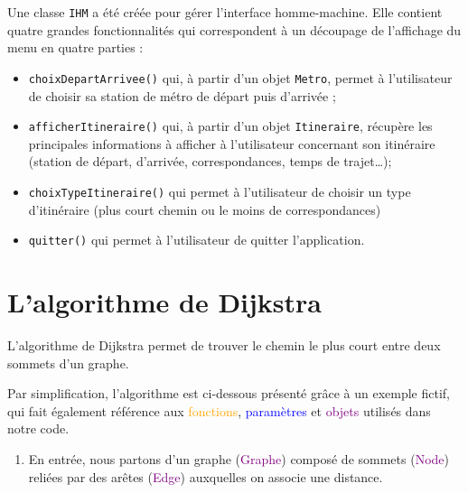 \documentclass[,french]{article}
\providecommand{\tightlist}{%
  \setlength{\itemsep}{0pt}\setlength{\parskip}{0pt}}
\begin{document}
Une classe \texttt{IHM} a été créée pour gérer l'interface
homme-machine. Elle contient quatre grandes fonctionnalités qui
correspondent à un découpage de l'affichage du menu en quatre parties :

\begin{itemize}
\item
  \texttt{choixDepartArrivee()} qui, à partir d'un objet \texttt{Metro},
  permet à l'utilisateur de choisir sa station de métro de départ puis
  d'arrivée ;
\item
  \texttt{afficherItineraire()} qui, à partir d'un objet
  \texttt{Itineraire}, récupère les principales informations à afficher
  à l'utilisateur concernant son itinéraire (station de départ,
  d'arrivée, correspondances, temps de trajet\ldots{});
\item
  \texttt{choixTypeItineraire()} qui permet à l'utilisateur de choisir
  un type d'itinéraire (plus court chemin ou le moins de
  correspondances)
\item
  \texttt{quitter()} qui permet à l'utilisateur de quitter
  l'application.
\end{itemize}

\hypertarget{sec:algo}{%
\section{L'algorithme de Dijkstra}\label{sec:algo}}

L'algorithme de Dijkstra permet de trouver le chemin le plus court entre
deux sommets d'un graphe.

Par simplification, l'algorithme est ci-dessous présenté grâce à un
exemple fictif, qui fait également référence aux
\textcolor{orange}{fonctions}, \textcolor{blue}{paramètres} et
\textcolor{purple}{objets} utilisés dans notre code.

\begin{enumerate}
\def\labelenumi{\arabic{enumi}.}
\tightlist
\item
  En entrée, nous partons d'un graphe (\textcolor{purple}{Graphe})
  composé de sommets (\textcolor{purple}{Node}) reliées par des arêtes
  (\textcolor{purple}{Edge}) auxquelles on associe une distance.
\end{enumerate}
\end{document}
